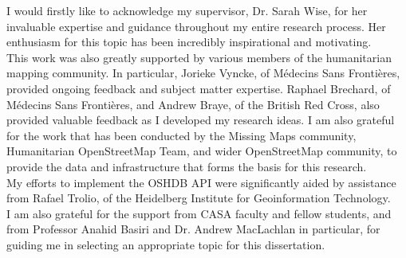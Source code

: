 \begin{acknowledgements}

\noindent I would firstly like to acknowledge my supervisor, Dr. Sarah Wise, for her invaluable expertise and guidance throughout my entire research process. Her enthusiasm for this topic has been incredibly inspirational and motivating.  \\

\noindent This work was also greatly supported by various members of the humanitarian mapping community. In particular, Jorieke Vyncke, of Médecins Sans Frontières, provided ongoing feedback and subject matter expertise. Raphael Brechard, of Médecins Sans Frontières, and Andrew Braye, of the British Red Cross, also provided valuable feedback as I developed my research ideas. I am also grateful for the work that has been conducted by the Missing Maps community, Humanitarian OpenStreetMap Team, and wider OpenStreetMap community, to provide the data and infrastructure that forms the basis for this research. \\

\noindent My efforts to implement the OSHDB API were significantly aided by assistance from Rafael Trolio, of the Heidelberg Institute for Geoinformation Technology.  \\

\noindent I am also grateful for the support from CASA faculty and fellow students, and from Professor Anahid Basiri and Dr. Andrew MacLachlan in particular, for guiding me in selecting an appropriate topic for this dissertation.

\end{acknowledgements}


